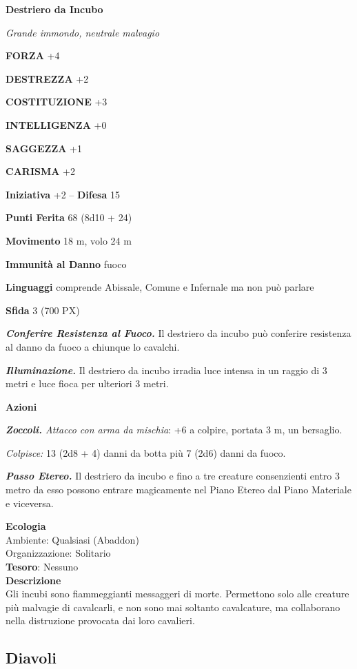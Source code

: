 \begin{multicols}{2}
\medskip{}\textbf{Destriero da Incubo}

\textit{Grande immondo, neutrale malvagio}

\textbf{FORZA} +4

\textbf{DESTREZZA} +2

\textbf{COSTITUZIONE} +3

\textbf{INTELLIGENZA} +0

\textbf{SAGGEZZA} +1

\textbf{CARISMA} +2

\textbf{Iniziativa} +2 -- \textbf{Difesa} 15

\textbf{Punti Ferita} 68 (8d10 + 24)

\textbf{Movimento} 18 m, volo 24 m

\textbf{Immunità al Danno} fuoco

\textbf{Linguaggi} comprende Abissale, Comune e Infernale ma non può parlare

\textbf{Sfida} 3 (700 PX)

\textit{\textbf{Conferire Resistenza al Fuoco.}} Il destriero da incubo può conferire resistenza al danno da fuoco a chiunque lo cavalchi.

\textit{\textbf{Illuminazione.}} Il destriero da incubo irradia luce intensa in un raggio di 3 metri e luce fioca per ulteriori 3 metri.

\textbf{Azioni}

\textit{\textbf{Zoccoli.} Attacco con arma da mischia}: +6 a colpire, portata 3 m, un bersaglio.

\textit{Colpisce:} 13 (2d8 + 4) danni da botta più 7 (2d6) danni da fuoco.

\textit{\textbf{Passo Etereo.}} Il destriero da incubo e fino a tre creature consenzienti entro 3 metro da esso possono entrare magicamente nel Piano Etereo dal Piano Materiale e viceversa.

\textbf{Ecologia}\\
Ambiente: Qualsiasi (Abaddon)\\
Organizzazione: Solitario\\
\textbf{Tesoro}: Nessuno\\
\textbf{Descrizione}\\
Gli incubi sono fiammeggianti messaggeri di morte. Permettono solo alle creature più malvagie di cavalcarli, e non sono mai soltanto cavalcature, ma collaborano nella distruzione provocata dai loro cavalieri.

\subsection{Diavoli}


\end{multicols}
